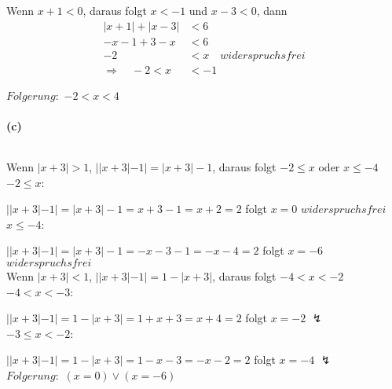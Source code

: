 Wenn $x+1<0$, daraus folgt $x<-1$ und $x-3<0$, dann
\begin{align*}
|x+1|+|x-3|&<6\\
-x-1+3-x&<6\\
-2&<x\hspace{1em}widerspruchsfrei\\
\Rightarrow\hspace{1em}-2<x&<-1
\end{align*}

$Folgerung:$ $-2<x<4$

\newpage

\paragraph{(c)}
$ $\newline

Wenn $|x+3|>1$, $||x+3|-1|=|x+3|-1$, daraus folgt $-2\leq x$ oder $x\leq -4$\\

$-2\leq x$:

$||x+3|-1|=|x+3|-1=x+3-1=x+2=2$ folgt $x=0$ $widerspruchsfrei$\\

$x\leq -4$:

$||x+3|-1|=|x+3|-1=-x-3-1=-x-4=2$ folgt $x=-6$ $widerspruchsfrei$\\

Wenn $|x+3|<1$, $||x+3|-1|=1-|x+3|$, daraus folgt $-4<x<-2$\\

$-4<x<-3$:

$||x+3|-1|=1-|x+3|=1+x+3=x+4=2$ folgt $x=-2$ $\lightning$\\

$-3\leq x<-2$:

$||x+3|-1|=1-|x+3|=1-x-3=-x-2=2$ folgt $x=-4$ $\lightning$\\

$Folgerung:$ $(x=0)\vee(x=-6)$
